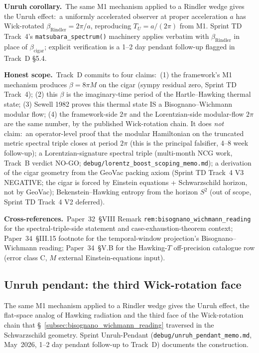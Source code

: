 \documentclass[11pt]{article}
\begin{document}
\textbf{Unruh corollary.}\ The same M1 mechanism applied to a Rindler
wedge gives the Unruh effect:\ a uniformly accelerated observer at
proper acceleration $a$ has Wick-rotated $\beta_{\mathrm{Rindler}} =
2\pi/a$, reproducing $T_U = a/(2\pi)$ from M1.  Sprint TD Track~4's
\texttt{matsubara\_spectrum()} machinery applies verbatim with
$\beta_{\mathrm{Rindler}}$ in place of $\beta_{\mathrm{cigar}}$;
explicit verification is a 1--2 day pendant follow-up flagged in
Track~D \S 5.4.

\textbf{Honest scope.}\ Track~D commits to four claims:\ (1) the
framework's M1 mechanism produces $\beta = 8\pi M$ on the cigar (sympy
residual zero, Sprint TD Track~4); (2) this $\beta$ is the
imaginary-time period of the Hartle--Hawking thermal state; (3) Sewell
1982 proves this thermal state IS a Bisognano--Wichmann modular flow;
(4) the framework-side $2\pi$ and the Lorentzian-side modular-flow
$2\pi$ are the same number, by the published Wick-rotation chain.  It
does \emph{not} claim:\ an operator-level proof that the modular
Hamiltonian on the truncated metric spectral triple closes at period
$2\pi$ (this is the principal falsifier, 4--8 week follow-up); a
Lorentzian-signature spectral triple (multi-month NCG work, Track~B
verdict NO-GO; \texttt{debug/lorentz\_boost\_scoping\_memo.md}); a
derivation of the cigar geometry from the GeoVac packing axiom (Sprint
TD Track~4 V3 NEGATIVE; the cigar is forced by Einstein equations +
Schwarzschild horizon, not by GeoVac); Bekenstein--Hawking entropy
from the horizon $S^2$ (out of scope, Sprint TD Track~4 V2 deferred).

\textbf{Cross-references.}\ Paper~32~§VIII Remark
\texttt{rem:bisognano\_wichmann\_reading} for the spectral-triple-side
statement and case-exhaustion-theorem context; Paper~34~§III.15
footnote for the temporal-window projection's Bisognano--Wichmann
reading; Paper~34~§V.B for the Hawking-$T$ off-precision catalogue row
(error class C, $M$ external Einstein-equations input).

\subsection{Unruh pendant: the third Wick-rotation face}
\label{subsec:unruh_pendant}

The same M1 mechanism applied to a Rindler wedge gives the Unruh
effect, the flat-space analog of Hawking radiation and the third face
of the Wick-rotation chain that
\S~\ref{subsec:bisognano_wichmann_reading} traversed in the
Schwarzschild geometry.  Sprint Unruh-Pendant
(\texttt{debug/unruh\_pendant\_memo.md}, May~2026, 1--2 day pendant
follow-up to Track~D) documents the construction.
\end{document}

